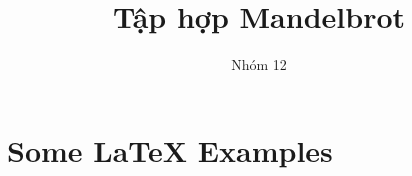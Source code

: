 \documentclass{beamer}
\title[Your Short Title]{Tập hợp Mandelbrot }
\author{Nhóm 12}
\begin{document}
\begin{frame}
  \titlepage
\end{frame}








\section{Some \LaTeX{} Examples}



\end{document}
